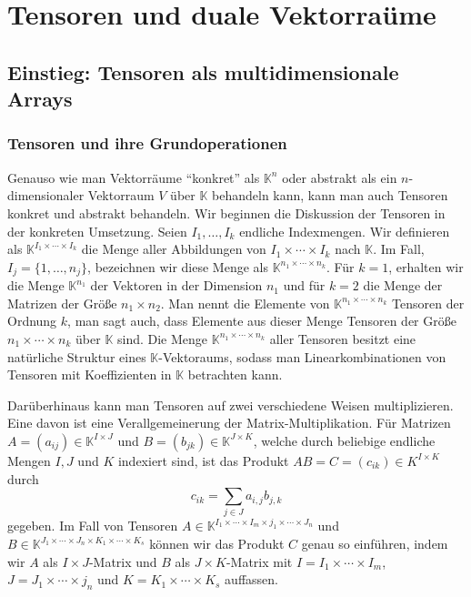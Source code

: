 \documentclass[
a4paper,12pt,
bibliography=totocnumbered,
numbers=noenddot,
]{scrartcl}
\numberwithin{equation}{subsection}
\newcommand{\K}{\mathbb K}
\theoremstyle{plain}
\theoremstyle{definition}
\begin{document}
\section{Tensoren und duale Vektorraüme} 

\subsection{Einstieg: Tensoren als multidimensionale Arrays} 

\subsubsection{Tensoren und ihre Grundoperationen}

Genauso wie man Vektorräume ``konkret'' als $\K^n$ oder abstrakt als ein $n$-dimensionaler Vektorraum $V$ über $\K$ behandeln kann, kann man auch Tensoren konkret und abstrakt behandeln. Wir beginnen die Diskussion der Tensoren in der konkreten Umsetzung. Seien $I_1,\ldots, I_k$ endliche Indexmengen. Wir definieren als $\K^{I_1 \times \cdots \times I_k}$ die Menge aller Abbildungen von $I_1 \times \cdots \times I_k$ nach $\K$. Im Fall, $I_j = \{1,\ldots, n_j\}$, bezeichnen wir diese Menge als $\K^{n_1 \times \cdots \times n_k}$. Für $k=1$, erhalten wir die Menge $\K^{n_1}$ der Vektoren in der Dimension $n_1$ und für $k=2$ die Menge der Matrizen der Größe $n_1 \times n_2$. Man nennt die Elemente von $\K^{n_1 \times \cdots \times n_k}$ Tensoren der Ordnung $k$, man sagt auch, dass Elemente aus dieser Menge Tensoren der Größe $n_1 \times \cdots \times n_k$ über $\K$ sind. Die Menge  $\K^{n_1 \times \cdots \times n_k}$ aller Tensoren besitzt eine natürliche Struktur eines $\K$-Vektoraums, sodass man Linearkombinationen von Tensoren mit Koeffizienten in $\K$ betrachten kann. 

Darüberhinaus kann man Tensoren auf zwei verschiedene Weisen multiplizieren. Eine davon ist eine Verallgemeinerung der Matrix-Multiplikation. Für Matrizen $A = (a_{ij}) \in \K^{I \times J}$ und $B = (b_{jk}) \in \K^{J \times K}$, welche durch beliebige endliche Mengen $I, J$ und $K$ indexiert sind, ist das Produkt $AB = C = (c_{ik}) \in K^{I \times K}$ durch 
\[
		c_{ik} = \sum_{j \in J} a_{i,j} b_{j,k}
\]
gegeben. Im Fall von Tensoren $A \in \K^{I_1 \times \cdots \times I_m \times j_1 \times \cdots \times J_n}$ und $B \in \K^{J_1 \times \cdots \times J_n \times K_1 \times \cdots \times K_s}$ können wir das Produkt $C$ genau so einführen, indem wir $A$ als $I \times J$-Matrix und $B$ als $J \times K$-Matrix mit $I = I_1 \times \cdots \times I_m$, $J= J_1 \times \cdots \times j_n$ und $K= K_1 \times \cdots \times K_s$ auffassen. 
\end{document}
